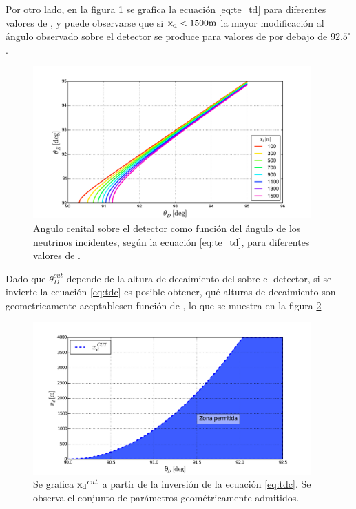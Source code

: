 	Por otro lado, en la figura \ref{fig:te_td} se grafica la ecuaci\'on \ref{eq:te_td} para diferentes valores de \xd{}, y puede observarse que si ${\rm x_d}<1500{\rm m}$ la mayor modificaci\'on al \'angulo observado sobre el detector se produce para valores de \te{} por debajo de $92.5^\circ$.
	\begin{figure}[ht!]
		\centering
		\includegraphics[width=0.95\textwidth]{./fig/appendix/thE_thD}
		\caption{\label{fig:te_td}
		Angulo cenital sobre el detector como funci\'on del \'angulo de los neutrinos incidentes, seg\'un la ecuaci\'on \ref{eq:te_td}, para diferentes valores de \xd{}.
		}
	\end{figure}
	Dado que $\theta_D^{cut}$ depende de la altura de decaimiento del \tauon{} sobre el detector, \xd{} si se invierte la ecuaci\'on \ref{eq:tdc} es posible obtener, qu\'e alturas de decaimiento \xd{} son geometricamente aceptablesen funci\'on de \td{}, lo que se muestra en la figura \ref{fig:dx_thcut}
	\begin{figure}[ht!]
		\centering
		\includegraphics[width=0.95\textwidth]{./fig/appendix/thetaDCut_mod}
		\caption{\label{fig:dx_thcut}
		Se grafica ${\rm x_d}^{cut}$ a partir de la inversi\'on de la ecuaci\'on \ref{eq:tdc}. Se observa el conjunto de par\'ametros geom\'etricamente admitidos.
		}
	\end{figure}

